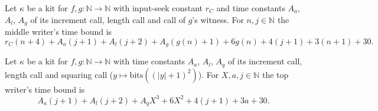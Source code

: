 \begin{definition}
\label{Turing.NTimeDiag.qyMidB}
\leanok
{}
Let $\kappa$ be a kit for $f, g : \mathbb{N} \to \mathbb{N}$ with input-seek constant $r_C$ and
time constants $A_a$, $A_l$, $A_g$ of its increment call, length call and call of $g$'s witness.
For $n, j \in \mathbb{N}$ the middle writer's time bound is \[ r_C(n + 4) + A_a(j + 1) + A_l(j + 2)
+ A_g(g(n) + 1) + 6g(n) + 4(j + 1) + 3(n + 1) + 30. \]
\end{definition}

\begin{definition}
\label{Turing.NTimeDiag.qyTopB}
\leanok
{}
Let $\kappa$ be a kit for $f, g : \mathbb{N} \to \mathbb{N}$ with time constants $A_a$, $A_l$,
$A_q$ of its increment call, length call and squaring call ($y \mapsto \mathrm{bits}((|y| +
1)^2)$). For $X, a, j \in \mathbb{N}$ the top writer's time bound is \[ A_a(j + 1) + A_l(j + 2) +
A_q X^3 + 6X^2 + 4(j + 1) + 3a + 30. \]
\end{definition}

